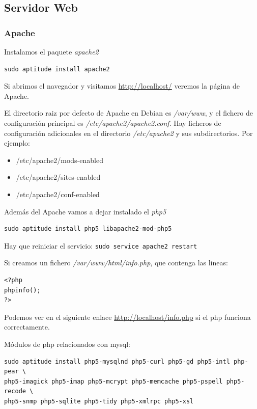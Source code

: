 \documentclass[12pt,spanish,]{scrartcl}
\providecommand{\tightlist}{%
  \setlength{\itemsep}{0pt}\setlength{\parskip}{0pt}}
\begin{document}
\hypertarget{servidor-web}{%
\subsection{Servidor Web}\label{servidor-web}}

\hypertarget{apache}{%
\subsubsection{Apache}\label{apache}}

Instalamos el paquete \emph{apache2}

\begin{verbatim}
sudo aptitude install apache2
\end{verbatim}

Si abrimos el navegador y visitamos \url{http://localhost/} veremos la
página de Apache.

El directorio raiz por defecto de Apache en Debian es \emph{/var/www}, y
el fichero de configuración principal es
\emph{/etc/apache2/apache2.conf}. Hay ficheros de configuración
adicionales en el directorio \emph{/etc/apache2} y sus subdirectorios.
Por ejemplo:

\begin{itemize}
\tightlist
\item
  /etc/apache2/mods-enabled
\item
  /etc/apache2/sites-enabled
\item
  /etc/apache2/conf-enabled
\end{itemize}

Además del Apache vamos a dejar instalado el \emph{php5}

\begin{verbatim}
sudo aptitude install php5 libapache2-mod-php5
\end{verbatim}

Hay que reiniciar el servicio: \texttt{sudo\ service\ apache2\ restart}

Si creamos un fichero \emph{/var/www/html/info.php}, que contenga las
lineas:

\begin{verbatim}
<?php
phpinfo();
?>
\end{verbatim}

Podemos ver en el siguiente enlace \url{http://localhost/info.php} si el
php funciona correctamente.

Módulos de php relacionados con mysql:

\begin{verbatim}
sudo aptitude install php5-mysqlnd php5-curl php5-gd php5-intl php-pear \
php5-imagick php5-imap php5-mcrypt php5-memcache php5-pspell php5-recode \
php5-snmp php5-sqlite php5-tidy php5-xmlrpc php5-xsl
\end{verbatim}
\end{document}
